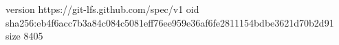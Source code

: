 version https://git-lfs.github.com/spec/v1
oid sha256:eb4f6acc7b3a84c084c5081eff76ee959e36af6fe2811154bdbe3621d70b2d91
size 8405
